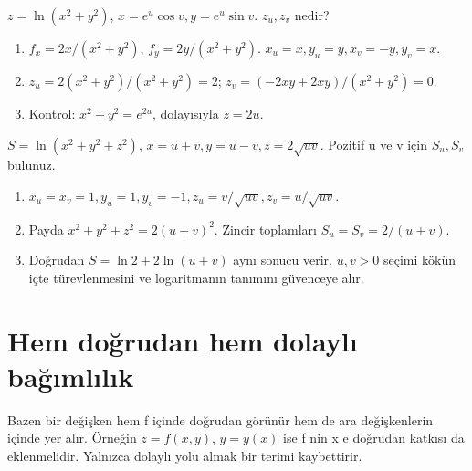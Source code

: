 \begin{tcolorbox}[title={Örnek 6.3 | Tahtadaki logaritma örneği},colframe=accent]\(z=\ln(x^2+y^2)\), \(x=e^u\cos v,y=e^u\sin v\). \(z_u,z_v\) nedir?
\par{}\end{tcolorbox}
\begin{tcolorbox}[title={Adım adım çözüm},colback=green!3!white,colframe=green]\begin{enumerate}
\item \(f_x=2x/(x^2+y^2)\), \(f_y=2y/(x^2+y^2)\). \(x_u=x,y_u=y,x_v=-y,y_v=x\).
\item \(z_u=2(x^2+y^2)/(x^2+y^2)=2\); \(z_v=(-2xy+2xy)/(x^2+y^2)=0\).
\item Kontrol: \(x^2+y^2=e^{2u}\), dolayısıyla \(z=2u\).
\end{enumerate}\end{tcolorbox}
\begin{tcolorbox}[title={Örnek 6.4 | Üç ara değişkenli ders örneği},colframe=accent]\(S=\ln(x^2+y^2+z^2)\), \(x=u+v,y=u-v,z=2\sqrt{uv}\). Pozitif u ve v için \(S_u,S_v\) bulunuz.
\par{}\end{tcolorbox}
\begin{tcolorbox}[title={Adım adım çözüm},colback=green!3!white,colframe=green]\begin{enumerate}
\item \(x_u=x_v=1,y_u=1,y_v=-1,z_u=v/\sqrt{uv},z_v=u/\sqrt{uv}\).
\item Payda \(x^2+y^2+z^2=2(u+v)^2\). Zincir toplamları \(S_u=S_v=2/(u+v)\).
\item Doğrudan \(S=\ln2+2\ln(u+v)\) aynı sonucu verir. \(u,v>0\) seçimi kökün içte türevlenmesini ve logaritmanın tanımını güvenceye alır.
\end{enumerate}\end{tcolorbox}
\section{Hem doğrudan hem dolaylı bağımlılık}
Bazen bir değişken hem f içinde doğrudan görünür hem de ara değişkenlerin içinde yer alır. Örneğin \(z=f(x,y)\), \(y=y(x)\) ise f nin x e doğrudan katkısı da eklenmelidir. Yalnızca dolaylı yolu almak bir terimi kaybettirir.


